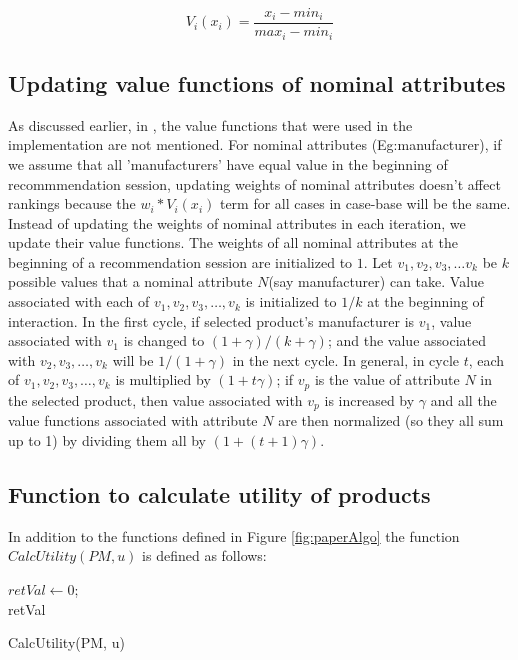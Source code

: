 \begin{equation}
\label{eq:valueMIB}
V_i(x_i) =  \frac{x_i-min_i}{max_i - min_i}
\end{equation}


\subsection{Updating value functions of nominal attributes}
\label{sec:valueFunc}
As discussed earlier, in \cite{mautPaper}, the value functions that were used in the implementation are not mentioned.
For nominal attributes (Eg:manufacturer), if we assume that all 'manufacturers' have equal value in the beginning of recommmendation session, updating weights of nominal attributes doesn't affect rankings because the $w_i*V_i(x_i)$ term for all cases in case-base will be the same.
Instead of updating the weights of nominal attributes in each iteration, we update their value functions.
The weights of all nominal attributes at the beginning of a recommendation session are initialized to $1$.
Let $v_1, v_2, v_3,\hdots v_k$ be $k$ possible values that a nominal attribute $N$(say manufacturer) can take.
Value associated with each of $v_1, v_2, v_3,\hdots, v_k$ is initialized to $1/k$ at the beginning of interaction.
In the first cycle, if selected product's manufacturer is $v_1$, value associated with $v_1$ is changed to $(1+\gamma)/(k+\gamma)$; and the value associated with $v_2, v_3, \hdots, v_k$ will be $1/(1+\gamma)$ in the next cycle.
In general, in cycle $t$,  each of $v_1, v_2, v_3,\hdots, v_k$ is multiplied by $(1 + t\gamma)$; if $v_p$ is the value of attribute $N$ in the selected product, then value associated with $v_p$ is increased by $\gamma$ and all the value functions associated with attribute $N$ are then normalized (so they all sum up to 1)  by dividing them all by $(1+ (t+1)\gamma)$.


\subsection{Function to calculate utility of products}
\label{sec:utility}
In addition to the functions defined in Figure \ref{fig:paperAlgo} the function $CalcUtility(PM, u)$ is defined as follows:

\begin{algorithm}[ht]
  \DontPrintSemicolon

  $retVal \gets 0$;\\
  \Return retVal
  \caption{CalcUtility(PM, u)}
  \label{algo:utility}
\end{algorithm}





